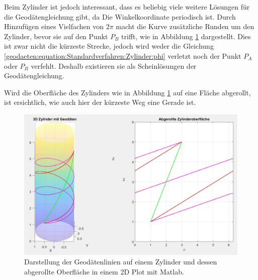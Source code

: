 Beim Zylinder ist jedoch interessant, dass es beliebig viele weitere Lösungen für die Geodätengleichung gibt, da Die Winkelkoordinate periodisch ist.
Durch Hinzufügen eines Vielfachen von $2\pi$ macht die Kurve zusätzliche Runden um den Zylinder, bevor sie auf den Punkt $P_B$ trifft, wie in Abbildung \ref{geodaeten:figure:Linienelemente:Zylinder:figure1} dargestellt.
Dies ist zwar nicht die kürzeste Strecke, jedoch wird weder die Gleichung \eqref{geodaeten:equation:Standardverfahren:Zylinder:phi} verletzt noch der Punkt $P_A$ oder $P_B$ verfehlt.
Deshalb existieren sie als Scheinlösungen der Geodätengleichung.

Wird die Oberfläche des Zylinders wie in Abbildung \ref{geodaeten:figure:Linienelemente:Zylinder:figure1} auf eine Fläche abgerollt, ist ersichtlich, wie auch hier der kürzeste Weg eine Gerade ist.  

\begin{figure}
	\centering
	\includegraphics[width=\textwidth]{papers/geodaeten/Abbildungen/Standardverfahren/Zylinder}
	\caption{Darstellung der Geodätenlinien auf einem Zylinder und dessen abgerollte Oberfläche in einem 2D Plot mit Matlab.}
	\label{geodaeten:figure:Linienelemente:Zylinder:figure1}
\end{figure}
